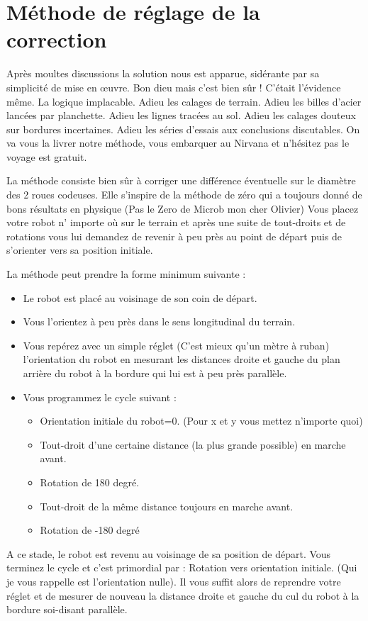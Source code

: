 \documentclass[a4paper]{report}
\begin{document}
\section{Méthode de réglage de la correction}
Après moultes discussions la solution nous est apparue, sidérante par sa simplicité de mise en œuvre. Bon dieu mais c’est bien sûr ! C’était l’évidence même. La logique implacable. Adieu les calages de terrain. Adieu les billes d’acier lancées par planchette. Adieu les lignes tracées au sol. Adieu les calages douteux sur bordures incertaines. Adieu les séries d’essais aux conclusions discutables. 
On va vous la livrer notre méthode, vous embarquer au Nirvana et n’hésitez pas le voyage est gratuit.  

La méthode consiste bien sûr à corriger une différence éventuelle sur le diamètre des 2 roues codeuses. Elle s’inspire de la méthode de zéro qui a toujours donné de bons résultats en physique (Pas le Zero de Microb mon cher Olivier)
Vous placez votre robot n’ importe où sur le terrain et après une suite de tout-droits et de rotations vous lui demandez de revenir à peu près au point de départ puis de s’orienter vers sa position initiale.

La méthode peut prendre la forme minimum suivante :
\begin{itemize}
\item Le robot est placé au voisinage de son coin de départ. 
\item Vous l’orientez à peu près dans le sens longitudinal du terrain.
\item Vous repérez avec un simple réglet (C’est mieux qu’un mètre à ruban) l’orientation du robot en mesurant les distances droite et gauche du plan arrière du robot à la bordure qui lui est à peu près parallèle. 
\item Vous programmez le cycle suivant :
\begin{itemize}
\item Orientation initiale du robot=0. (Pour x et y vous mettez n’importe quoi)
\item Tout-droit d’une certaine distance (la plus grande possible) en marche avant.
\item Rotation de 180 degré. 
\item Tout-droit de la même distance toujours en marche avant.
\item Rotation de -180 degré
\end{itemize}

\end{itemize}
A ce stade, le robot est revenu au voisinage de sa position de départ.
Vous terminez le cycle et c’est primordial par :
Rotation vers orientation initiale. (Qui je vous rappelle est l’orientation nulle).
Il vous suffit alors de reprendre votre réglet et de mesurer de nouveau la distance droite et gauche du cul du robot à la bordure soi-disant parallèle.
\end{document}
